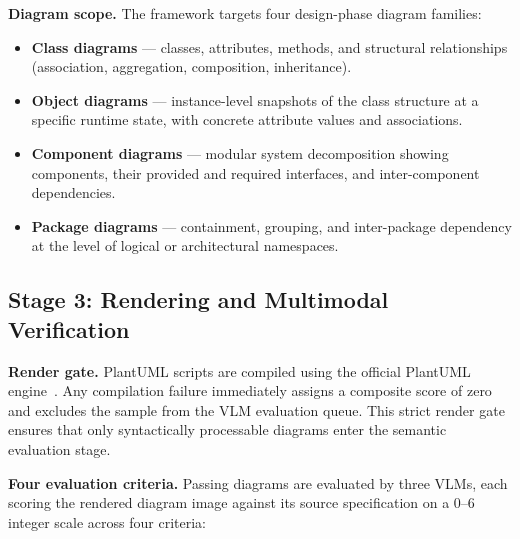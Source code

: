 \documentclass[conference]{IEEEtran}
\begin{document}
\textbf{Diagram scope.}
The framework targets four design-phase diagram families:
\begin{itemize}
  \item \textbf{Class diagrams} — classes, attributes, methods, and
    structural relationships (association, aggregation, composition,
    inheritance).
  \item \textbf{Object diagrams} — instance-level snapshots of the
    class structure at a specific runtime state, with concrete
    attribute values and associations.
  \item \textbf{Component diagrams} — modular system decomposition
    showing components, their provided and required interfaces, and
    inter-component dependencies.
  \item \textbf{Package diagrams} — containment, grouping, and
    inter-package dependency at the level of logical or architectural
    namespaces.
\end{itemize}

\subsection{Stage 3: Rendering and Multimodal Verification}

\textbf{Render gate.}
PlantUML scripts are compiled using the official PlantUML
engine~\cite{plantuml}. Any compilation failure immediately assigns a
composite score of zero and excludes the sample from the VLM
evaluation queue. This strict render gate ensures that only
syntactically processable diagrams enter the semantic evaluation
stage.

\textbf{Four evaluation criteria.}
Passing diagrams are evaluated by three VLMs, each scoring the
rendered diagram image against its source specification on a 0--6
integer scale across four criteria:
\end{document}
